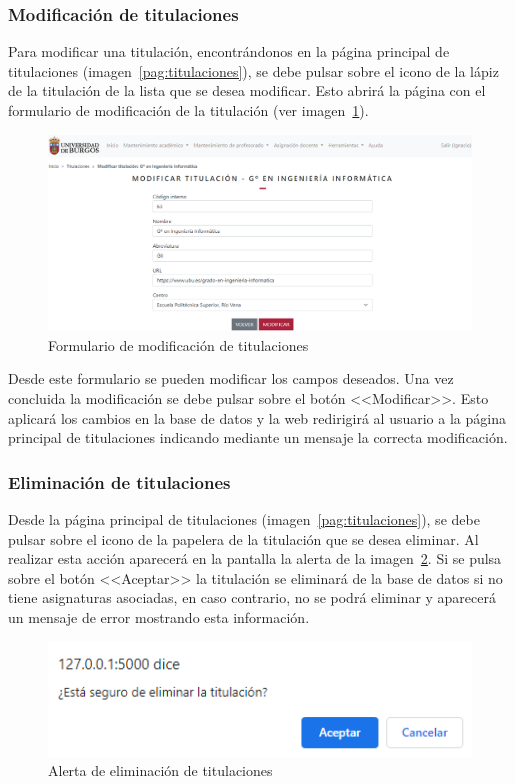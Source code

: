 \subsubsection{Modificación de titulaciones}
Para modificar una titulación, encontrándonos en la página principal de titulaciones (imagen~\ref{pag:titulaciones}), se debe pulsar sobre el icono de la lápiz de la titulación de la lista que se desea modificar.
Esto abrirá la página con el formulario de modificación de la titulación (ver imagen~\ref{pag:formModTitulacion}).

\begin{figure}
	\centering
	\includegraphics[width=\textwidth]{../img/Anexos/Manual usuario/formModTitulacion.png}
	\caption{Formulario de modificación de titulaciones}\label{pag:formModTitulacion}
\end{figure}

Desde este formulario se pueden modificar los campos deseados.
Una vez concluida la modificación se debe pulsar sobre el botón <<Modificar>>.
Esto aplicará los cambios en la base de datos y la web redirigirá al usuario a la página principal de titulaciones indicando mediante un mensaje la correcta modificación.

\subsubsection{Eliminación de titulaciones}
Desde la página principal de titulaciones (imagen~\ref{pag:titulaciones}), se debe pulsar sobre el icono de la papelera de la titulación que se desea eliminar.
Al realizar esta acción aparecerá en la pantalla la alerta de la imagen~\ref{pag:alertElTitulacion}. Si se pulsa sobre el botón <<Aceptar>> la titulación se eliminará de la base de datos si no tiene asignaturas asociadas, en caso contrario, no se podrá eliminar y aparecerá un mensaje de error mostrando esta información.

\begin{figure}
	\centering
	\includegraphics[width=.65\textwidth]{../img/Anexos/Manual usuario/alertElTitulacion.png}
	\caption{Alerta de eliminación de titulaciones}\label{pag:alertElTitulacion}
\end{figure}

